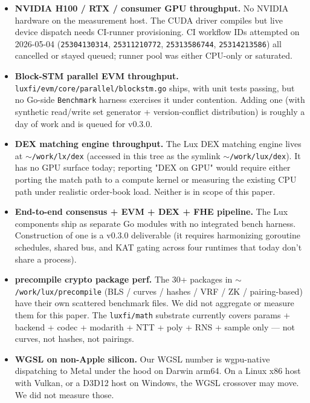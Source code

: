 \begin{itemize}[nosep,leftmargin=2em]
\item \textbf{NVIDIA H100 / RTX / consumer GPU throughput.} No NVIDIA
hardware on the measurement host. The CUDA driver compiles but live
device dispatch needs CI-runner provisioning. CI workflow IDs
attempted on 2026-05-04 (\texttt{25304130314}, \texttt{25311210772},
\texttt{25313586744}, \texttt{25314213586}) all cancelled or stayed
queued; runner pool was either CPU-only or saturated.

\item \textbf{Block-STM parallel EVM throughput.}
\texttt{luxfi/evm/core/parallel/blockstm.go} ships, with unit tests
passing, but no Go-side \texttt{Benchmark} harness exercises it
under contention. Adding one (with synthetic read/write set
generator + version-conflict distribution) is roughly a day of work
and is queued for v0.3.0.

\item \textbf{DEX matching engine throughput.} The Lux DEX matching
engine lives at \texttt{$\sim$/work/lx/dex} (accessed in this tree
as the symlink \texttt{$\sim$/work/lux/dex}). It has no GPU surface
today; reporting "DEX on GPU" would require either porting the
match path to a compute kernel or measuring the existing CPU path
under realistic order-book load. Neither is in scope of this paper.

\item \textbf{End-to-end consensus + EVM + DEX + FHE pipeline.}
The Lux components ship as separate Go modules with no integrated
bench harness. Construction of one is a v0.3.0 deliverable (it
requires harmonizing goroutine schedules, shared bus, and KAT
gating across four runtimes that today don't share a process).

\item \textbf{precompile crypto package perf.} The 30+ packages in
\texttt{$\sim$/work/lux/precompile} (BLS / curves / hashes / VRF /
ZK / pairing-based) have their own scattered benchmark files. We
did not aggregate or measure them for this paper. The
\texttt{luxfi/math} substrate currently covers params + backend +
codec + modarith + NTT + poly + RNS + sample only — not curves,
not hashes, not pairings.

\item \textbf{WGSL on non-Apple silicon.} Our WGSL number is
wgpu-native dispatching to Metal under the hood on Darwin arm64.
On a Linux x86 host with Vulkan, or a D3D12 host on Windows, the
WGSL crossover may move. We did not measure those.
\end{itemize}

